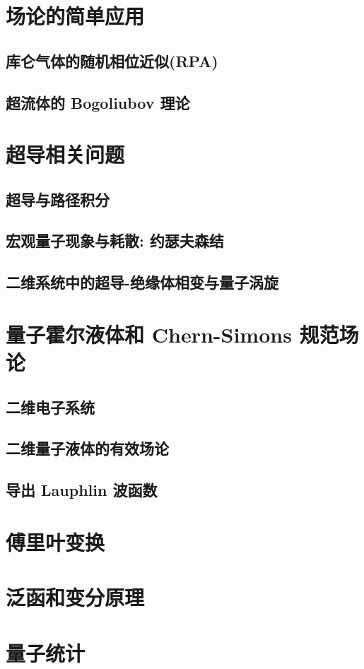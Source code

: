 \documentclass[b5paper]{book}
\begin{document}
\chapter{场论的简单应用}
\section{库仑气体的随机相位近似(RPA)}
\section{超流体的 Bogoliubov 理论}

\chapter{超导相关问题}
\section{超导与路径积分}
\section{宏观量子现象与耗散: 约瑟夫森结}
\section{二维系统中的超导-绝缘体相变与量子涡旋}

\chapter{量子霍尔液体和 Chern-Simons 规范场论}
\section{二维电子系统}
\section{二维量子液体的有效场论}
\section{导出 Lauphlin 波函数}

\begin{appendix}
\chapter{傅里叶变换}
\chapter{泛函和变分原理}
\chapter{量子统计}
\end{appendix}
\end{document}
